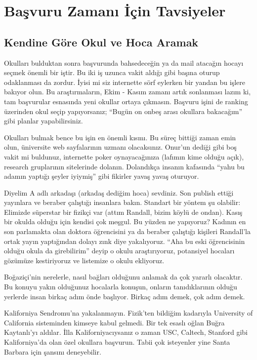 \documentclass[12pt]{article}
\theoremstyle{break}
\begin{document}
\newpage
%
%
\section{Başvuru Zamanı İçin Tavsiyeler}
%
\subsection{Kendine Göre Okul ve Hoca Aramak}
Okulları bulduktan sonra başvurunda bahsedeceğin ya da mail atacağın hocayı seçmek önemli bir iştir. Bu iki iş uzunca vakit aldığı gibi başına oturup odaklanması da zordur. İyisi mi siz internette sörf eylerken bir yandan bu işlere bakıyor olun. Bu araştırmaların, Ekim - Kasım zamanı artık sonlanması lazım ki, tam başvurular esnasında yeni okullar ortaya çıkmasın. Başvuru işini de ranking üzerinden okul seçip yapıyorsanız; “Bugün on onbeş arası okullara bakacağım” gibi planlar yapabilirsiniz.

Okulları bulmak bence bu işin en önemli kısmı. Bu süreç bittiği zaman emin olun, üniversite web sayfalarının uzmanı olacaksınız. Onur’un dediği gibi boş vakit mi buldunuz, internette poker oynayacağınıza (lafımın kime olduğu açık), research gruplarının sitelerinde dolanın. Dolandıkça insanın kafasında “yahu bu adamın yaptığı şeyler iyiymiş” gibi fikirler yavaş yavaş oturuyor.

Diyelim A adlı arkadaşı (arkadaş dediğim hoca) sevdiniz. Son publish ettiği yayınlara ve beraber çalıştığı insanlara bakın. Standart bir yöntem şu olabilir: Elimizde süperstar bir fizikçi var (attım Randall, bizim köylü de ondan). Kasış bir okulda olduğu için kendisi çok meşgul. Bu yüzden ne yapıyoruz? Kadının en son parlamakta olan doktora öğrencisini ya da beraber çalıştığı kişileri Randall’la ortak yayın yaptığından dolayı zınk diye yakalıyoruz. “Aha bu eski öğrencisinin olduğu okula da girebilirim” deyip o okulu araştırıyoruz, potansiyel hocaları gözümüze kestiriyoruz ve listemize o okulu ekliyoruz. 

Boğaziçi’nin nerelerle, nasıl bağları olduğunu anlamak da çok yararlı olacaktır. Bu konuyu yakın olduğunuz hocalarla konuşun, onların tanıdıklarının olduğu yerlerde insan birkaç adım önde başlıyor. Birkaç adım demek, çok adım demek. 

Kaliforniya Sendromu’na yakalanmayın. Fizik’ten bildiğim kadarıyla University of California sisteminden kimseye kabul gelmedi. Bir tek esaslı oğlan Buğra Kaytanlı’yı aldılar. İlla Kaliforniyacıysanız o zaman USC, Caltech, Stanford gibi Kaliforniya’da olan özel okullara başvurun. Tabii çok isteyenler yine Santa Barbara için şansını deneyebilir.
\end{document}
